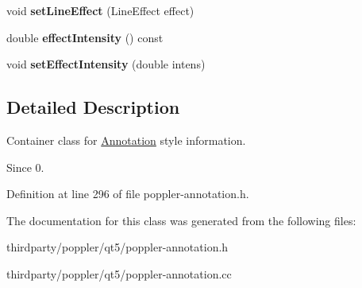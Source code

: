 \begin{DoxyCompactItemize}
void {\bfseries set\+Line\+Effect} (Line\+Effect effect)
\item 
\mbox{\label{class_poppler_1_1_annotation_1_1_style_a094e9654caf019eefb7cc59e97450b63}} 
double {\bfseries effect\+Intensity} () const
\item 
\mbox{\label{class_poppler_1_1_annotation_1_1_style_a92c0de0a9bfd758551b36cfefaaf06c0}} 
void {\bfseries set\+Effect\+Intensity} (double intens)
\end{DoxyCompactItemize}


\subsection{Detailed Description}
Container class for \hyperlink{class_poppler_1_1_annotation}{Annotation} style information. 

\begin{DoxySince}{Since}
0. 
\end{DoxySince}


Definition at line 296 of file poppler-\/annotation.\+h.



The documentation for this class was generated from the following files\+:\begin{DoxyCompactItemize}
\item 
thirdparty/poppler/qt5/poppler-\/annotation.\+h\item 
thirdparty/poppler/qt5/poppler-\/annotation.\+cc\end{DoxyCompactItemize}
